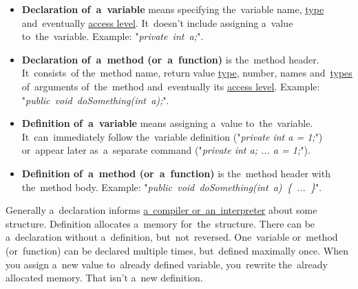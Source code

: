 \label{declarationdefinition}
\begin{itemize}
    \item \textbf{Declaration of~a~variable} means specifying the~variable name, \hyperref[datatypes]{type} and~eventually \hyperref[accessmodifiers]{access level}. It~doesn't include assigning a~value to~the~variable. Example: "\textit{\mbox{private int a;}}".
    \item \textbf{Declaration of~a~method (or~a~function)} is the~method header. It~consists~of the~method name, return value \hyperref[datatypes]{type}, number, names and~\hyperref[datatypes]{types} of~arguments of~the~method and~eventually its \hyperref[accessmodifiers]{access level}. Example: "\textit{\mbox{public void doSomething(int a);}}".
    \item \textbf{Definition of~a~variable} means assigning a~value to~the~variable. It~can~immediately follow the~variable definition ("\textit{private int a = 1;}") or~appear later as~a~separate command ("\textit{private int a; ... a = 1;}").
    \item \textbf{Definition of~a~method (or~a~function)} is the~method header with the~method body. Example: "\textit{\mbox{public void doSomething(int a) \{ ... \}}}".
\end{itemize}
\noindent Generally a~declaration informs \hyperref[compiledinterpretedlanguages]{a~compiler or~an~interpreter} about some structure. Definition allocates a~memory for~the~structure. There can be a~declaration without a~definition, but~not~reversed. One~variable or~method (or~function) can be declared multiple times, but~defined maximally once. When you assign a~new value to~already defined variable, you~rewrite the~already allocated memory. That isn't a~new definition.

